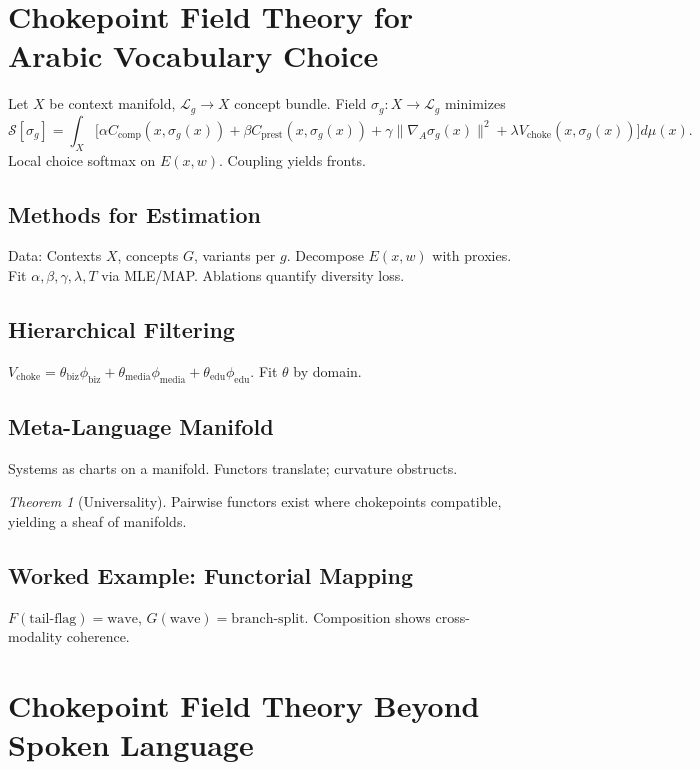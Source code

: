 \documentclass[12pt]{article}
\theoremstyle{remark}
\newtheorem*{theorem*}{Theorem}
\begin{document}
\section{Chokepoint Field Theory for Arabic Vocabulary Choice}
\label{app:vocabulary}
Let $X$ be context manifold, $\mathcal{L}_g \to X$ concept bundle. Field $\sigma_g: X \to \mathcal{L}_g$ minimizes
\[
\mathcal{S}[\sigma_g] = \int_X \big[ \alpha C_{\text{comp}}(x,\sigma_g(x)) + \beta C_{\text{prest}}(x,\sigma_g(x)) + \gamma \|\nabla_A \sigma_g(x)\|^2 + \lambda V_{\text{choke}}(x,\sigma_g(x)) \big] d\mu(x).
\]
Local choice softmax on $E(x,w)$. Coupling yields fronts.

\subsection{Methods for Estimation}
Data: Contexts $X$, concepts $G$, variants per $g$. Decompose $E(x,w)$ with proxies. Fit $\alpha,\beta,\gamma,\lambda,T$ via MLE/MAP. Ablations quantify diversity loss.

\subsection{Hierarchical Filtering}
$V_{\text{choke}} = \theta_{\text{biz}} \phi_{\text{biz}} + \theta_{\text{media}} \phi_{\text{media}} + \theta_{\text{edu}} \phi_{\text{edu}}$. Fit $\theta$ by domain.

\subsection{Meta-Language Manifold}
Systems as charts on a manifold. Functors translate; curvature obstructs.

\begin{theorem*}[Universality]
Pairwise functors exist where chokepoints compatible, yielding a sheaf of manifolds.
\end{theorem*}

\subsection{Worked Example: Functorial Mapping}
$F(\text{tail-flag}) = \text{wave}$, $G(\text{wave}) = \text{branch-split}$. Composition shows cross-modality coherence.

\section{Chokepoint Field Theory Beyond Spoken Language}
\label{app:gestural}
\end{document}

